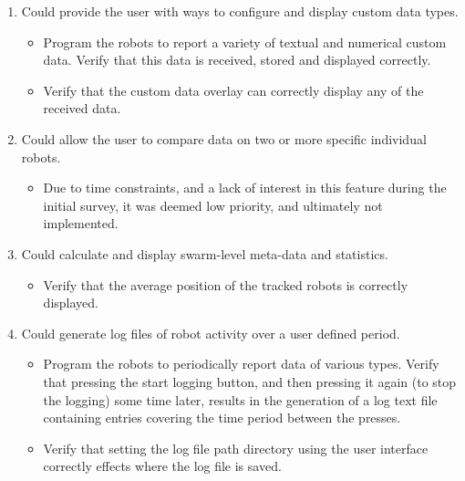 \begin{enumerate}[label=S\arabic*.]
 \item Could provide the user with ways to configure and display custom data types.
 \begin{itemize}
  \item Program the robots to report a variety of textual and numerical custom data. Verify that this data is received, stored and displayed correctly.
  \item Verify that the custom data overlay can correctly display any of the received data.
 \end{itemize}
 
 \item Could allow the user to compare data on two or more specific individual robots.
 \begin{itemize}
  \item Due to time constraints, and a lack of interest in this feature during the initial survey, it was deemed low priority, and ultimately not implemented.
 \end{itemize}
 
 \item Could calculate and display swarm-level meta-data and statistics.
 \begin{itemize}
  \item Verify that the average position of the tracked robots is correctly displayed.
 \end{itemize}
 
 \item Could generate log files of robot activity over a user defined period.
 \begin{itemize}
  \item Program the robots to periodically report data of various types. Verify that pressing the start logging button, and then pressing it again (to stop the logging) some time later, results in the generation of a log text file containing entries covering the time period between the presses.
  \item Verify that setting the log file path directory using the user interface correctly effects where the log file is saved.
 \end{itemize}
\end{enumerate}

